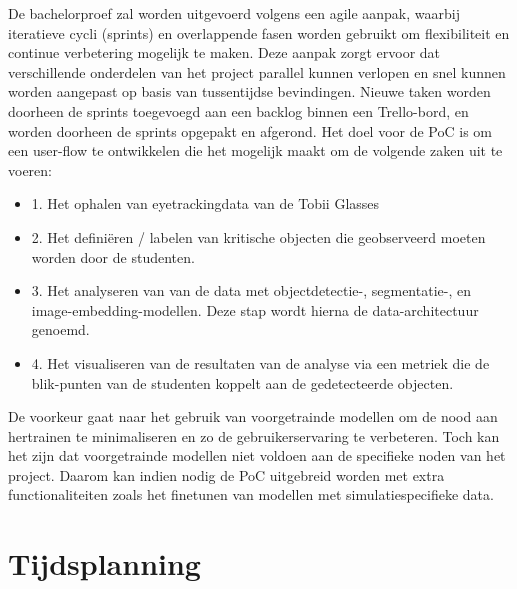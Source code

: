 De bachelorproef zal worden uitgevoerd volgens een agile aanpak, waarbij iteratieve cycli (sprints) en overlappende fasen worden gebruikt om flexibiliteit en continue verbetering mogelijk te maken. 
Deze aanpak zorgt ervoor dat verschillende onderdelen van het project parallel kunnen verlopen en snel kunnen worden aangepast op basis van tussentijdse bevindingen.
Nieuwe taken worden doorheen de sprints toegevoegd aan een backlog binnen een Trello-bord, en worden doorheen de sprints opgepakt en afgerond.
Het doel voor de PoC is om een user-flow te ontwikkelen die het mogelijk maakt om de volgende zaken uit te voeren:
\begin{itemize}
    \item 1. Het ophalen van eyetrackingdata van de Tobii Glasses
    \item 2. Het definiëren / labelen van kritische objecten die geobserveerd moeten worden door de studenten.
    \item 3. Het analyseren van van de data met objectdetectie-, segmentatie-, en image-embedding-modellen. 
    Deze stap wordt hierna de data-architectuur genoemd.
    \item 4. Het visualiseren van de resultaten van de analyse via een metriek die de blik-punten van de studenten koppelt aan de gedetecteerde objecten.
\end{itemize}
\par
De voorkeur gaat naar het gebruik van voorgetrainde modellen om de nood aan hertrainen te minimaliseren en zo de gebruikerservaring te verbeteren. 
Toch kan het zijn dat voorgetrainde modellen niet voldoen aan de specifieke noden van het project. 
Daarom kan indien nodig de PoC uitgebreid worden met extra functionaliteiten zoals het finetunen van modellen met simulatiespecifieke data.

\section{Tijdsplanning}

